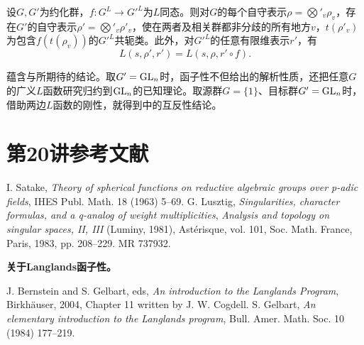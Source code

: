 \begin{conjecture}[关于$L$群的自守形式函子性]\label{L20S2O5}
设$G,G'$为约化群，$f:G^L\to G'^L$为$L$同态。则对$G$的每个自守表示$\rho=\bigotimes'_v\rho_v$，存在$G'$的自守表示$\rho'=\bigotimes'_v\rho'_v$，使在两者及相关群都非分歧的所有地方$v$，$t(\rho'_v)$为包含$f(t(\rho_v))$的$G'^L$共轭类。此外，对$G'^L$的任意有限维表示$r'$，有
\[L(s,\rho',r')=L(s,\rho,r'\circ f).\]
\end{conjecture}
\begin{note}[L20S2O6]
蕴含与所期待的结论。取$G'=\operatorname{GL}_n$时，函子性不但给出的解析性质，还把任意$G$的广义$L$函数研究归约到$\operatorname{GL}_n$的已知理论。取源群$G=\{1\}$、目标群$G'=\operatorname{GL}_n$时，借助两边$L$函数的刚性，就得到中的互反性结论。
\end{note}
\section{第20讲参考文献}\label{L20S3}
\begin{references}
 I. Satake, \textit{Theory of spherical functions on reductive algebraic groups over p-adic fields}, IHES Publ. Math. 18 (1963) 5--69.
 G. Lusztig, \textit{Singularities, character formulas, and a q-analog of weight multiplicities}, \textit{Analysis and topology on singular spaces, II, III} (Luminy, 1981), Ast\'erisque, vol. 101, Soc. Math. France, Paris, 1983, pp. 208--229. MR 737932.
\end{references}
\textbf{关于Langlands函子性。}
\begin{references}
 J. Bernstein and S. Gelbart, eds, \textit{An introduction to the Langlands Program}, Birkh\"auser, 2004, Chapter 11 written by J. W. Cogdell.
 S. Gelbart, \textit{An elementary introduction to the Langlands program}, Bull. Amer. Math. Soc. 10 (1984) 177--219.
\end{references}
